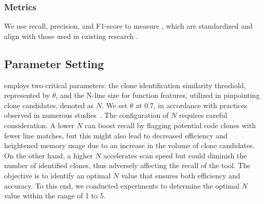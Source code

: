 \subsubsection{Metrics}
We use recall, precision, and F1-score to measure \toolname, which are standardized and align with those used in existing research \cite{sajnani2016sourcerercc, wang2018ccaligner, nil2021}.


\subsection{Parameter Setting}\label{sec:rq1}
\toolname employs two critical parameters: the clone identification similarity threshold, represented by $\theta$, and the N-line size for function features, utilized in pinpointing clone candidates, denoted as $N$. 
We set $\theta$ at 0.7, in accordance with practices observed in numerous studies~\cite{roy2008nicad,nil2021,code2img2023}. 
The configuration of $N$ requires careful consideration.
A lower $N$ can boost recall by flagging potential code clones with fewer line matches, but this might also lead to decreased efficiency and heightened memory usage due to an increase in the volume of clone candidates.
On the other hand, a higher $N$ accelerates scan speed but could diminish the number of identified clones, thus adversely affecting the recall of the tool. 
The objective is to identify an optimal $N$ value that ensures both efficiency and accuracy.
To this end, we conducted experiments to determine the optimal $N$ value within the range of 1 to 5.

